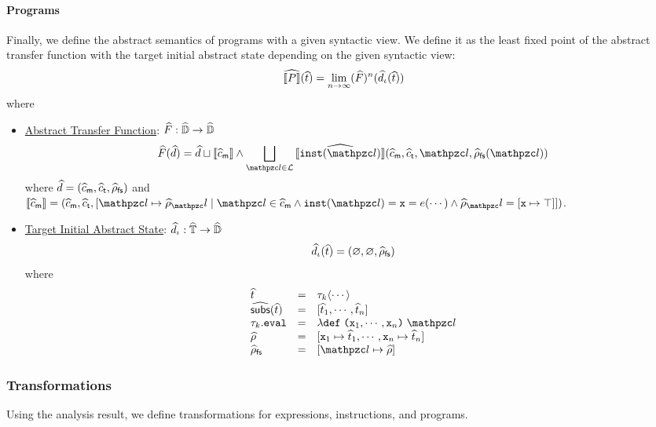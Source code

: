 \paragraph{Programs} Finally, we define the abstract semantics of programs with
a given syntactic view.  We define it as the least fixed point of the abstract
transfer function with the target initial abstract state depending on the given
syntactic view:
\[
  \widehat{\llbracket{P}\rrbracket}(\widehat{t}) = \lim_{n \rightarrow
  \infty}(\widehat{F})^n(\widehat{d}_\iota(\widehat{t}))
\]
where
\begin{itemize}
  \item \underline{Abstract Transfer Function}: $\widehat{F}: \widehat{\mathbb{D}}
    \rightarrow \widehat{\mathbb{D}}$
    \[
      \atransfer(\aelem) = \aelem \join \sem{\amctxt} \wedge
      \bigjoin_{\lab \in \labset}{\asem{\getinst(\lab)}(\amctxt, \atctxt, \lab,
      \afsenv(\lab))}
    \]
    where $\widehat{d} = (\widehat{c}_{\textsf{m}}, \widehat{c}_{\textsf{t}}, \widehat{\rho}_{\textsf{fs}})$ and $\sem{\amctxt} = (\amctxt,
    \atctxt, [\lab \mapsto \aenv_\lab \mid \lab \in \amctxt \wedge
    \getinst(\lab) = \varx = \expr(\cdots) \wedge \aenv_\lab = [\varx \mapsto
    \top]])$.
  \item \underline{Target Initial Abstract State}: $\widehat{d}_\iota:
    \widehat{\mathbb{T}} \rightarrow \widehat{\mathbb{D}}$
    \[
      \widehat{d}_\iota(\widehat{t}) = (\varnothing, \varnothing, \widehat{\rho}_{\textsf{fs}})
    \]
    where \[
      \begin{array}{lcl}
        \atree &=& \ty_k \langle \cdots \rangle\\

        \agetsubs(\atree) &=& [\atree_1, \cdots, \atree_n]\\

        \ty_k.\eval &=& \lambda \kwdef \; \kwrl \varx_1, \cdots, \varx_n \kwrr
        \; \lab\\

        \aenv &=& [\varx_1 \mapsto \atree_1, \cdots, \varx_n \mapsto
        \atree_n]\\

        \afsenv &=& [\lab \mapsto \aenv]\\
      \end{array}
    \]
\end{itemize}


\subsubsection{Transformations}

Using the analysis result, we define transformations for expressions,
instructions, and programs.

